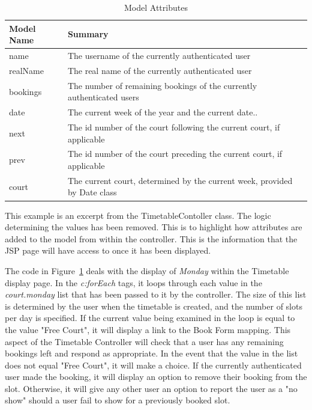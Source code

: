 \begin{table}[H]
\begin{center}
\caption{Model Attributes}
    \begin{tabular}{ | l | l | p{5cm} |}
    \hline
    Model Name & Summary \\ \hline
    name & The username of the currently authenticated user  \\ \hline
    realName & The real name of the currently authenticated user\\ \hline
	bookings & The number of remaining bookings of the currently authenticated users\\ \hline
	date & The current week of the year and the current date..\\ \hline
	next & The id number of the court following the current court, if applicable\\ \hline
    prev & The id number of the court preceding the current court, if applicable\\ \hline
	court & The current court, determined by the current week, provided by Date class \\
    \hline
    \end{tabular}
\end{center}

\label{fig:ttmodelattributes}
\end{table}

This example is an excerpt from the TimetableContoller class. The logic determining the values has been removed. This is to highlight how attributes are added to the model from within the controller. This is the information that the JSP page will have access to once it has been displayed.

The code in Figure~\ref{fig:ttmodelattributes} deals with the display of \textit{Monday} within the Timetable display page. In the \textit{c:forEach} tags, it loops through each value in the \textit{court.monday} list that has been passed to it by the controller. The size of this list is determined by the user when the timetable is created, and the number of slots per day is specified. If the current value being examined in the loop is equal to the value "Free Court", it will display a link to the Book Form mapping. This aspect of the Timetable Controller will check that a user has any remaining bookings left and respond as appropriate. In the event that the value in the list does not equal "Free Court", it will make a choice. If the currently authenticated user made the booking, it will display an option to remove their booking from the slot. Otherwise, it will give any other user an option to report the user as a "no show" should a user fail to show for a previously booked slot. \newline


